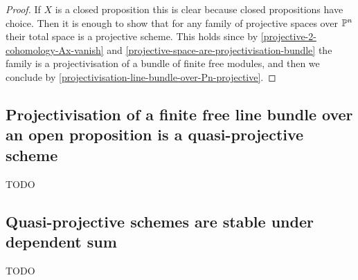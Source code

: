 \begin{proof}
If $X$ is a closed proposition this is clear because closed propositions have choice. Then it is enough to show that for any family of projective spaces over $\mathbb{P}^n$ their total space is a projective scheme. This holds since by \cref{projective-2-cohomology-Ax-vanish} and \cref{projective-space-are-projectivisation-bundle} the family is a projectivisation of a bundle of finite free modules, and then we conclude by \cref{projectivisation-line-bundle-over-Pn-projective}.
\end{proof}

\subsection{Projectivisation of a finite free line bundle over an open proposition is a quasi-projective scheme}

TODO

\subsection{Quasi-projective schemes are stable under dependent sum}

TODO
